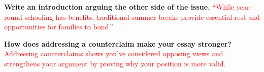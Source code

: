 \documentclass[12pt]{article}
\begin{document}
\vspace{1em}

\begin{tcolorbox}[colframe=black!60, colback=white, 
coltitle=black, colbacktitle=black!15, fonttitle=\bfseries\Large, 
title=Guided Practice, halign title=center, left=10pt, right=10pt, top=10pt, bottom=15pt]
\textbf{Write an introduction arguing the other side of the issue.}
\textcolor{red}{“While year-round schooling has benefits, traditional summer breaks provide essential rest and opportunities for families to bond.”}
\end{tcolorbox}

\vspace{1em}

\begin{tcolorbox}[colframe=black!60, colback=white, 
coltitle=black, colbacktitle=black!15, fonttitle=\bfseries\Large, 
title=Exit Ticket, halign title=center, left=10pt, right=10pt, top=10pt, bottom=15pt]
\textbf{How does addressing a counterclaim make your essay stronger?}
\textcolor{red}{Addressing counterclaims shows you’ve considered opposing views and strengthens your argument by proving why your position is more valid.}
\end{tcolorbox}
\end{document}
